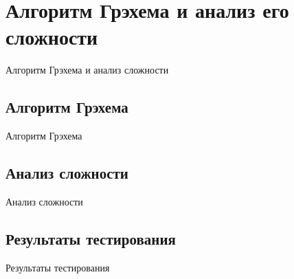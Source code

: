 \section{Алгоритм Грэхема и анализ его сложности}
Алгоритм Грэхема и анализ сложности

\subsection{Алгоритм Грэхема}
Алгоритм Грэхема

\subsection{Анализ сложности}
Анализ сложности

\subsection{Результаты тестирования}
Результаты тестирования

\newpage

